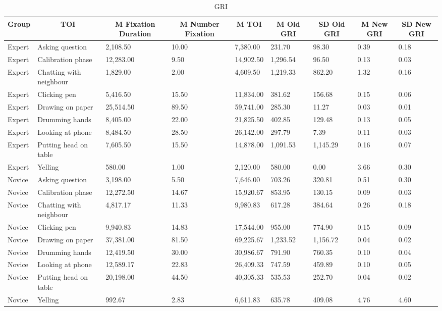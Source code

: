 \documentclass[
  english,
  man,floatsintext]{apa6}
\begin{document}
\begin{table}[h]

\begin{center}
\begin{threeparttable}

\caption{\label{tab:GRItable2}GRI}

\tiny{

\begin{tabular}{lllllllll}
\toprule
Group & \multicolumn{1}{c}{TOI} & \multicolumn{1}{c}{M Fixation Duration} & \multicolumn{1}{c}{M Number Fixation} & \multicolumn{1}{c}{M TOI} & \multicolumn{1}{c}{M Old GRI} & \multicolumn{1}{c}{SD Old GRI} & \multicolumn{1}{c}{M New GRI} & \multicolumn{1}{c}{SD New GRI}\\
\midrule
Expert & Asking question & 2,108.50 & 10.00 & 7,380.00 & 231.70 & 98.30 & 0.39 & 0.18\\
Expert & Calibration phase & 12,283.00 & 9.50 & 14,902.50 & 1,296.54 & 96.50 & 0.13 & 0.03\\
Expert & Chatting with neighbour & 1,829.00 & 2.00 & 4,609.50 & 1,219.33 & 862.20 & 1.32 & 0.16\\
Expert & Clicking pen & 5,416.50 & 15.50 & 11,834.00 & 381.62 & 156.68 & 0.15 & 0.06\\
Expert & Drawing on paper & 25,514.50 & 89.50 & 59,741.00 & 285.30 & 11.27 & 0.03 & 0.01\\
Expert & Drumming hands & 8,405.00 & 22.00 & 21,825.50 & 402.85 & 129.48 & 0.13 & 0.05\\
Expert & Looking at phone & 8,484.50 & 28.50 & 26,142.00 & 297.79 & 7.39 & 0.11 & 0.03\\
Expert & Putting head on table & 7,605.50 & 15.50 & 14,878.00 & 1,091.53 & 1,145.29 & 0.16 & 0.07\\
Expert & Yelling & 580.00 & 1.00 & 2,120.00 & 580.00 & 0.00 & 3.66 & 0.30\\
Novice & Asking question & 3,198.00 & 5.50 & 7,646.00 & 703.26 & 320.81 & 0.51 & 0.30\\
Novice & Calibration phase & 12,272.50 & 14.67 & 15,920.67 & 853.95 & 130.15 & 0.09 & 0.03\\
Novice & Chatting with neighbour & 4,817.17 & 11.33 & 9,980.83 & 617.28 & 384.64 & 0.26 & 0.18\\
Novice & Clicking pen & 9,940.83 & 14.83 & 17,544.00 & 955.00 & 774.90 & 0.15 & 0.09\\
Novice & Drawing on paper & 37,381.00 & 81.50 & 69,225.67 & 1,233.52 & 1,156.72 & 0.04 & 0.02\\
Novice & Drumming hands & 12,419.50 & 30.00 & 30,986.67 & 791.90 & 760.35 & 0.10 & 0.04\\
Novice & Looking at phone & 12,589.17 & 22.83 & 26,409.33 & 747.59 & 459.89 & 0.10 & 0.05\\
Novice & Putting head on table & 20,198.00 & 44.50 & 40,305.33 & 535.53 & 252.70 & 0.04 & 0.02\\
Novice & Yelling & 992.67 & 2.83 & 6,611.83 & 635.78 & 409.08 & 4.76 & 4.60\\
\bottomrule
\end{tabular}

}
\end{threeparttable}
\end{center}
\end{table}
\end{document}
